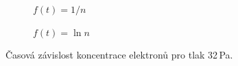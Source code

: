 \documentclass[a4paper,12pt]{article}
\begin{document}
\begin{figure}[h]
	\centering
	\begin{subfigure}[b]{.49\linewidth}
		\centering
		\caption{$f(t) = 1/n$}
	\end{subfigure}
	\begin{subfigure}[b]{.49\linewidth}
		\centering
		\caption{$f(t) = \ln n$}
	\end{subfigure}
	\caption{Časová závislost koncentrace elektronů pro tlak 32\,Pa.}
	\label{g:20Pa}
\end{figure}
\end{document}

